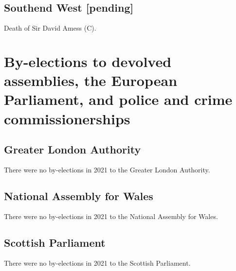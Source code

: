 \documentclass[a4paper,openany]{book}
\begin{document}
\section*{Southend West \hspace*{\fill}\nolinebreak[1]%
	\enspace\hspace*{\fill}
	[pending]}


Death of Sir David Amess (C).

\chapter{By-elections to devolved assemblies, the European Parliament, and police and crime commissionerships}

\section{Greater London Authority}

There were no by-elections in 2021 to the Greater London Authority.


\section{National Assembly for Wales}

There were no by-elections in 2021 to the National Assembly for Wales.


\section{Scottish Parliament}

There were no by-elections in 2021 to the Scottish Parliament.
\end{document}
